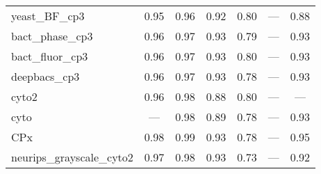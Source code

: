 \documentclass[./dissertation.tex]{subfiles}
\begin{document}
\begin{table}
\begin{tabular}{|l|c|c|c|c|c|c|}
        yeast\_BF\_cp3                            & 0.95                                    & 0.96                                        & 0.92                                    & 0.80                                  & ---                                    & 0.88                                    \\
        bact\_phase\_cp3                          & 0.96                                    & 0.97                                        & 0.93                                    & 0.79                                  & ---                                    & 0.93                                    \\
        bact\_fluor\_cp3                          & 0.96                                    & 0.97                                        & 0.93                                    & 0.80                                  & ---                                    & 0.93                                    \\
        deepbacs\_cp3                             & 0.96                                    & 0.97                                        & 0.93                                    & 0.78                                  & ---                                    & 0.93                                    \\
        cyto2                                     & 0.96                                    & 0.98                                        & 0.88                                    & 0.80                                  & ---                                    & ---                                     \\
        cyto                                      & ---                                     & 0.98                                        & 0.89                                    & 0.78                                  & ---                                    & 0.93                                    \\
        CPx                                       & 0.98                                    & 0.99                                        & 0.93                                    & 0.78                                  & ---                                    & 0.95                                    \\
        neurips\_grayscale\_cyto2                 & 0.97                                    & 0.98                                        & 0.93                                    & 0.73                                  & ---                                    & 0.92                                    \\

\end{tabular}
\end{table}
\end{document}
